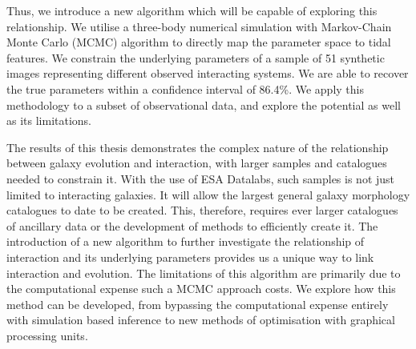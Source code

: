 \begin{abstracts}
Thus, we introduce a new algorithm which will be capable of exploring this relationship. We utilise a three-body numerical simulation with \DIFdelbegin {}\DIFdelend \DIFaddbegin {}\DIFaddend Markov-Chain Monte Carlo (MCMC) algorithm to directly map the parameter space to tidal features. We constrain the underlying parameters of a sample of 51 synthetic images representing different observed interacting systems. We are able to recover the true parameters within a confidence interval of 86.4\%. We apply this methodology to a subset of observational data, and explore the \DIFdelbegin {}\DIFdelend \DIFaddbegin {}\DIFaddend potential as well as its limitations.

The results of this thesis demonstrates the complex nature of the relationship between galaxy evolution and interaction, with larger samples and catalogues needed to constrain it. With the use of ESA Datalabs, \DIFdelbegin {}\DIFdelend \DIFaddbegin {}\DIFaddend such samples is not just limited to interacting galaxies. It will allow the largest general galaxy morphology catalogues to date to be created. This, therefore, requires ever larger catalogues of ancillary data or the development of methods to efficiently create it. The introduction of a new algorithm to further investigate the relationship of interaction and its underlying parameters provides us a unique way to link interaction and evolution. The limitations of this algorithm are primarily due to the computational expense such a MCMC approach costs. We explore how this method can be developed, from bypassing the computational expense entirely with simulation based inference to new methods of optimisation with graphical processing units.

\end{abstracts}



